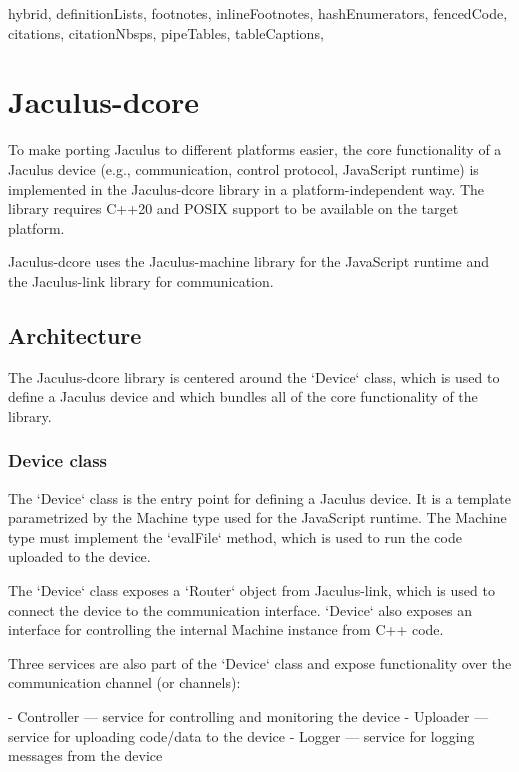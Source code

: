 \begin{markdown*}{%
  hybrid,
  definitionLists,
  footnotes,
  inlineFootnotes,
  hashEnumerators,
  fencedCode,
  citations,
  citationNbsps,
  pipeTables,
  tableCaptions,
}

\chapter{Jaculus-dcore}

To make porting Jaculus to different platforms easier, the core functionality of a Jaculus device (e.g., communication, control protocol, JavaScript runtime) is implemented in the Jaculus-dcore library in a platform-independent way. The library requires C++20 and POSIX support to be available on the target platform.

Jaculus-dcore uses the Jaculus-machine library for the JavaScript runtime and the Jaculus-link library for communication.

\section{Architecture}

The Jaculus-dcore library is centered around the `Device` class, which is used to define a Jaculus device and which bundles all of the core functionality of the library.

\subsection{Device class}

The `Device` class is the entry point for defining a Jaculus device. It is a template parametrized by the Machine type used for the JavaScript runtime. The Machine type must implement the `evalFile` method, which is used to run the code uploaded to the device.

The `Device` class exposes a `Router` object from Jaculus-link, which is used to connect the device to the communication interface. `Device` also exposes an interface for controlling the internal Machine instance from C++ code.

Three services are also part of the `Device` class and expose functionality over the communication channel (or channels):

  - Controller --- service for controlling and monitoring the device
  - Uploader --- service for uploading code/data to the device
  - Logger --- service for logging messages from the device


\end{markdown*}
